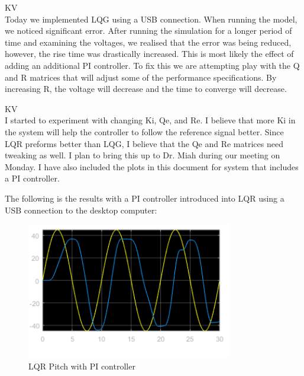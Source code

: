 \documentclass[fontsize=11pt, %
                             paper=letter, %
                             openany, %
                             captions=tableheading,
                             index=totoc,
                             hyperref]{labbook}
\begin{document}
\begin{addmargin}[0cm]{0cm}
KV\\
Today we implemented LQG using a USB connection.  When running the model, we noticed significant error.  After running the simulation for a longer period of time and examining the voltages, we realised that the error was being reduced, however, the rise time was drastically increased.  This is most likely the effect of adding an additional PI controller.  To fix this we are attempting play with the Q and R matrices that will adjust some of the performance specifications.  By increasing R, the voltage will decrease and the time to converge will decrease.

KV\\
I started to experiment with changing Ki, Qe, and Re.  I believe that more Ki in the system will help the controller to follow the reference signal better.  Since LQR preforms better than LQG, I believe that the Qe and Re matrices need tweaking as well.  I plan to bring this up to Dr. Miah during our meeting on Monday.  I have also included the plots in this document for system that includes a PI controller.

The following is the results with a PI controller introduced into LQR using a USB connection to the desktop computer:
\begin{figure}
  \centering
  \includegraphics[width=0.8\textwidth]{figs/img/02152019/LQR_Pitch.png}
  \caption{LQR Pitch with PI controller}
  \label{fig:LQR_PI_Pitch}
\end{figure}


\end{addmargin}
\end{document}
